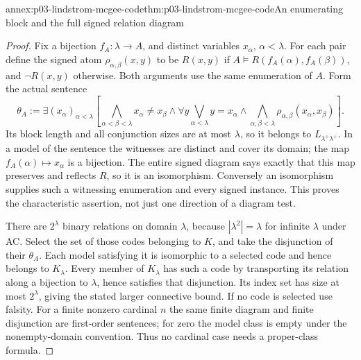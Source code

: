 \begin{annexitem}{annex:p03-lindstrom-mcgee-code}{thm:p03-lindstrom-mcgee-code}{An enumerating block and the full signed relation diagram}
\begin{proof}
Fix a bijection \(f_A:\lambda\to A\), and distinct variables
\(x_\alpha\), \(\alpha<\lambda\). For each pair define the signed
atom \(\rho_{\alpha,\beta}(x,y)\) to be \(R(x,y)\) if
\(A\models R(f_A(\alpha),f_A(\beta))\), and \(\neg R(x,y)\)
otherwise. Both arguments use the same enumeration of \(A\).
Form the actual sentence
\[
 \theta_A:=\exists(x_\alpha)_{\alpha<\lambda}
 \left[
 \bigwedge_{\alpha<\beta<\lambda}x_\alpha\ne x_\beta
 \land\forall y\bigvee_{\alpha<\lambda}y=x_\alpha
 \land\bigwedge_{\alpha,\beta<\lambda}
                         \rho_{\alpha,\beta}(x_\alpha,x_\beta)
 \right].
\]
Its block length and all conjunction sizes are at most \(\lambda\),
so it belongs to \(L_{\lambda^+\lambda^+}\). In a model of the
sentence the witnesses are distinct and cover its domain; the map
\(f_A(\alpha)\mapsto x_\alpha\) is a bijection. The entire signed
diagram says exactly that this map preserves and reflects \(R\),
so it is an isomorphism. Conversely an isomorphism supplies such a
witnessing enumeration and every signed instance. This proves the
characteristic assertion, not just one direction of a diagram test.

There are \(2^\lambda\) binary relations on domain \(\lambda\),
because \(|\lambda^2|=\lambda\) for infinite \(\lambda\) under AC.
Select the set of those codes belonging to \(K\), and take the
disjunction of their \(\theta_A\). Each model satisfying it is
isomorphic to a selected code and hence belongs to \(K_\lambda\).
Every member of \(K_\lambda\) has such a code by transporting its
relation along a bijection to \(\lambda\), hence satisfies that
disjunction. Its index set has size at most \(2^\lambda\), giving
the stated larger connective bound. If no code is selected use falsity.
For a finite nonzero cardinal \(n\) the same finite diagram and finite
disjunction are first-order sentences; for zero the model class is empty
under the nonempty-domain convention. Thus no cardinal case needs a
proper-class formula.
\end{proof}
\end{annexitem}

